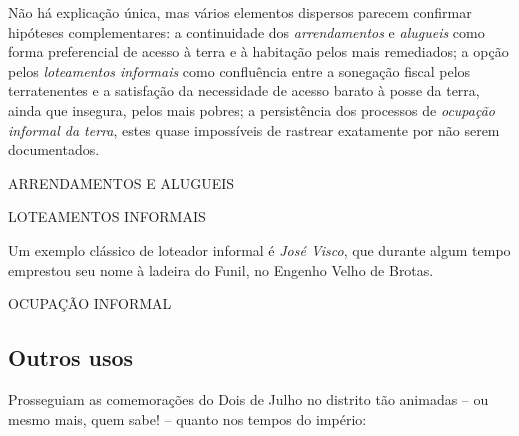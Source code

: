 Não há explicação única, mas vários elementos dispersos parecem confirmar hipóteses complementares: a continuidade dos \textit{arrendamentos} e \textit{alugueis} como forma preferencial de acesso à terra e à habitação pelos mais remediados; a opção pelos \textit{loteamentos informais} como confluência entre a sonegação fiscal pelos terratenentes e a satisfação da necessidade de acesso barato à posse da terra, ainda que insegura, pelos mais pobres; a persistência dos processos de \textit{ocupação informal da terra}, estes quase impossíveis de rastrear exatamente por não serem documentados.

ARRENDAMENTOS E ALUGUEIS

LOTEAMENTOS INFORMAIS

Um exemplo clássico de loteador informal é \textit{José Visco}, que durante algum tempo emprestou seu nome à ladeira do Funil, no Engenho Velho de Brotas. 

OCUPAÇÃO INFORMAL

\subsection{Outros usos}

Prosseguiam as comemorações do Dois de Julho no distrito tão animadas -- ou mesmo mais, quem sabe! -- quanto nos tempos do império:

